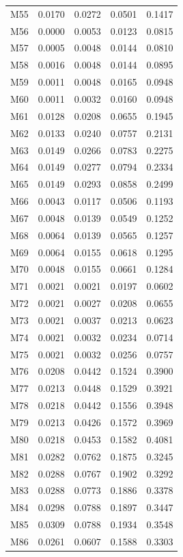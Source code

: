 \begin{longtable}{lrrrr}
M55 & 0.0170 & 0.0272 & 0.0501 & 0.1417 \\
M56 & 0.0000 & 0.0053 & 0.0123 & 0.0815 \\
M57 & 0.0005 & 0.0048 & 0.0144 & 0.0810 \\
M58 & 0.0016 & 0.0048 & 0.0144 & 0.0895 \\
M59 & 0.0011 & 0.0048 & 0.0165 & 0.0948 \\
M60 & 0.0011 & 0.0032 & 0.0160 & 0.0948 \\
M61 & 0.0128 & 0.0208 & 0.0655 & 0.1945 \\
M62 & 0.0133 & 0.0240 & 0.0757 & 0.2131 \\
M63 & 0.0149 & 0.0266 & 0.0783 & 0.2275 \\
M64 & 0.0149 & 0.0277 & 0.0794 & 0.2334 \\
M65 & 0.0149 & 0.0293 & 0.0858 & 0.2499 \\
M66 & 0.0043 & 0.0117 & 0.0506 & 0.1193 \\
M67 & 0.0048 & 0.0139 & 0.0549 & 0.1252 \\
M68 & 0.0064 & 0.0139 & 0.0565 & 0.1257 \\
M69 & 0.0064 & 0.0155 & 0.0618 & 0.1295 \\
M70 & 0.0048 & 0.0155 & 0.0661 & 0.1284 \\
M71 & 0.0021 & 0.0021 & 0.0197 & 0.0602 \\
M72 & 0.0021 & 0.0027 & 0.0208 & 0.0655 \\
M73 & 0.0021 & 0.0037 & 0.0213 & 0.0623 \\
M74 & 0.0021 & 0.0032 & 0.0234 & 0.0714 \\
M75 & 0.0021 & 0.0032 & 0.0256 & 0.0757 \\
M76 & 0.0208 & 0.0442 & 0.1524 & 0.3900 \\
M77 & 0.0213 & 0.0448 & 0.1529 & 0.3921 \\
M78 & 0.0218 & 0.0442 & 0.1556 & 0.3948 \\
M79 & 0.0213 & 0.0426 & 0.1572 & 0.3969 \\
M80 & 0.0218 & 0.0453 & 0.1582 & 0.4081 \\
M81 & 0.0282 & 0.0762 & 0.1875 & 0.3245 \\
M82 & 0.0288 & 0.0767 & 0.1902 & 0.3292 \\
M83 & 0.0288 & 0.0773 & 0.1886 & 0.3378 \\
M84 & 0.0298 & 0.0788 & 0.1897 & 0.3447 \\
M85 & 0.0309 & 0.0788 & 0.1934 & 0.3548 \\
M86 & 0.0261 & 0.0607 & 0.1588 & 0.3303 \\

\end{longtable}

